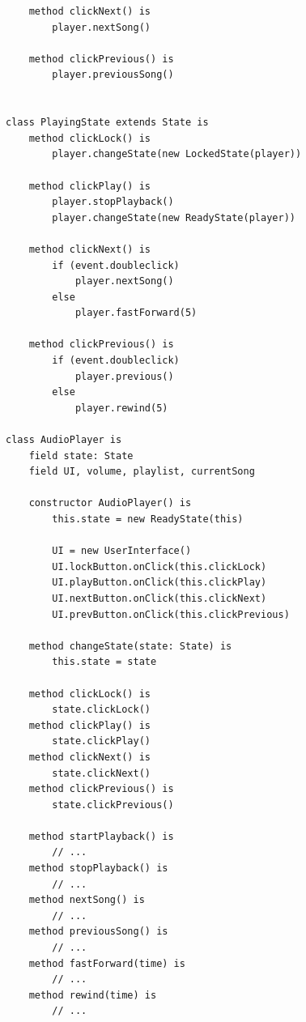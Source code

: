\documentclass[12pt, a4paper]{book}%
\begin{document}
{\begin{lstlisting}
    method clickNext() is
        player.nextSong()

    method clickPrevious() is
        player.previousSong()


class PlayingState extends State is
    method clickLock() is
        player.changeState(new LockedState(player))

    method clickPlay() is
        player.stopPlayback()
        player.changeState(new ReadyState(player))

    method clickNext() is
        if (event.doubleclick)
            player.nextSong()
        else
            player.fastForward(5)

    method clickPrevious() is
        if (event.doubleclick)
            player.previous()
        else
            player.rewind(5)

class AudioPlayer is
    field state: State
    field UI, volume, playlist, currentSong

    constructor AudioPlayer() is
        this.state = new ReadyState(this)

        UI = new UserInterface()
        UI.lockButton.onClick(this.clickLock)
        UI.playButton.onClick(this.clickPlay)
        UI.nextButton.onClick(this.clickNext)
        UI.prevButton.onClick(this.clickPrevious)

    method changeState(state: State) is
        this.state = state

    method clickLock() is
        state.clickLock()
    method clickPlay() is
        state.clickPlay()
    method clickNext() is
        state.clickNext()
    method clickPrevious() is
        state.clickPrevious()

    method startPlayback() is
        // ...
    method stopPlayback() is
        // ...
    method nextSong() is
        // ...
    method previousSong() is
        // ...
    method fastForward(time) is
        // ...
    method rewind(time) is
        // ...
\end{lstlisting}

}
\end{document}
